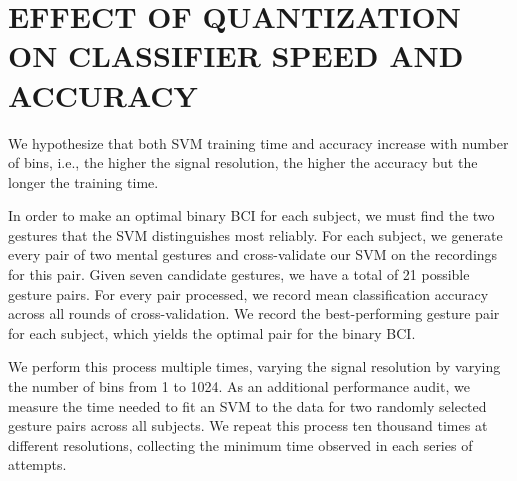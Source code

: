 \section{\uppercase{Effect of quantization on classifier speed and accuracy}}
\label{sec:quantization_eval}


We hypothesize that both SVM training time and accuracy increase with number of bins, i.e., the higher the signal resolution, the higher the accuracy but the longer the training time.



In order to make an optimal binary BCI for each subject, we must find the two gestures that the SVM distinguishes most reliably. For each subject, we generate every pair of two mental gestures and cross-validate our SVM on the recordings for this pair. Given seven candidate gestures, we have a total of 21 possible gesture pairs. For every pair processed, we record mean classification accuracy across all rounds of cross-validation. We record the best-performing gesture pair for each subject, which yields the optimal pair for the binary BCI.

We perform this process multiple times, varying the signal resolution by varying the number of bins from 1 to 1024. As an additional performance audit, we measure the time needed to fit an SVM to the data for two randomly selected gesture pairs across all subjects. We repeat this process ten thousand times at different resolutions, collecting the minimum time observed in each series of attempts.


